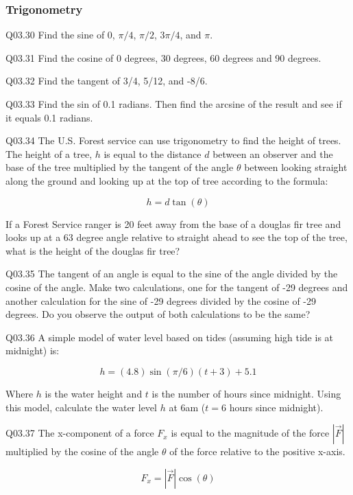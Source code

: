 \documentclass{book}
\newenvironment{problems}{}{}  %
\begin{document}
    
        \begin{problems}
        \hypertarget{trigonometry}{%
\subsubsection{Trigonometry}\label{trigonometry}}

Q03.30 Find the sine of \(0\), \(\pi/4\), \(\pi/2\), \(3\pi/4\), and
\(\pi\).

Q03.31 Find the cosine of 0 degrees, 30 degrees, 60 degrees and 90
degrees.

Q03.32 Find the tangent of 3/4, 5/12, and -8/6.

Q03.33 Find the sin of 0.1 radians. Then find the arcsine of the result
and see if it equals 0.1 radians.

Q03.34 The U.S. Forest service can use trigonometry to find the height
of trees. The height of a tree, \(h\) is equal to the distance \(d\)
between an observer and the base of the tree multiplied by the tangent
of the angle \(\theta\) between looking straight along the ground and
looking up at the top of tree according to the formula:

\[ h = d\tan(\theta) \]

If a Forest Service ranger is 20 feet away from the base of a douglas
fir tree and looks up at a 63 degree angle relative to straight ahead to
see the top of the tree, what is the height of the douglas fir tree?

Q03.35 The tangent of an angle is equal to the sine of the angle divided
by the cosine of the angle. Make two calculations, one for the tangent
of -29 degrees and another calculation for the sine of -29 degrees
divided by the cosine of -29 degrees. Do you observe the output of both
calculations to be the same?

Q03.36 A simple model of water level based on tides (assuming high tide
is at midnight) is:

\[ h = (4.8)\sin(\pi/6)(t+3)+5.1 \]

Where \(h\) is the water height and \(t\) is the number of hours since
midnight. Using this model, calculate the water level \(h\) at 6am
(\(t=6\) hours since midnight).

Q03.37 The x-component of a force \(F_x\) is equal to the magnitude of
the force \(|\vec{F}|\) multiplied by the cosine of the angle \(\theta\)
of the force relative to the positive x-axis.

\[ F_x = |\vec{F}|\cos(\theta) \]


\end{problems}
\end{document}
